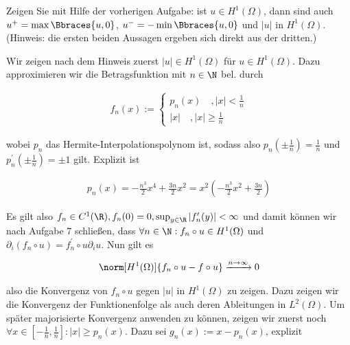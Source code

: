 
\begin{exercise}

Zeigen Sie mit Hilfe der vorherigen Aufgabe:
ist $u \in H^1(\Omega)$, dann sind auch $u^+ = \max \Bbraces{u, 0}$, $u^- = - \min \Bbraces{u, 0}$ und $|u|$ in $H^1(\Omega)$.
(Hinweis: die ersten beiden Aussagen ergeben sich direkt aus der dritten.)

\end{exercise}


\begin{solution}
Wir zeigen nach dem Hinweis zuerst $|u| \in H^1(\Omega)$ für $u \in H^1(\Omega)$. Dazu approximieren wir
die Betragsfunktion mit $n \in \N$ bel. durch

\begin{align*}
  f_n(x)
  :=
  \begin{cases}
    p_n(x) \quad , |x| < \frac{1}{n} \\
    |x|  \quad , |x| \geq \frac{1}{n}
  \end{cases}
\end{align*}

wobei $p_n$ das Hermite-Interpolationspolynom ist, sodass also $p_n(\pm \frac{1}{n}) = \frac{1}{n}$ und
$p_n^\prime(\pm \frac{1}{n}) = \pm 1$ gilt. Explizit ist

\begin{align*}
  p_n(x)
  =
  -\frac{n^3}{2}x^4 + \frac{3n}{2}x^2
  =
  x^2(-\frac{n^3}{2}x^2 + \frac{3n}{2})
\end{align*}

Es gilt also $f_n \in C^1(\R), f_n(0) = 0,\sup_{y \in \R}|f_n^\prime(y)|<\infty$ und damit können wir nach
Aufgabe $7$ schließen, dass $\forall n \in \N: f_n \circ u \in H^1(\Omega)$ und $\partial_i (f_n \circ u) =
f_n^\prime \circ u \partial_i u$. Nun gilt es

\begin{align*}
  \norm[H^1(\Omega)]{f_n \circ u - f \circ u}
  \xrightarrow{n \to \infty}
  0
\end{align*}

also die Konvergenz von $f_n \circ u$ gegen $|u|$ in $H^1(\Omega)$ zu zeigen. Dazu zeigen wir
die Konvergenz der Funktionenfolge als auch deren Ableitungen in $L^2(\Omega)$.
Um später majorisierte Konvergenz anwenden zu können, zeigen wir zuerst noch $\forall x \in [-\frac{1}{n},\frac{1}{n}]: |x| \geq p_n(x)$. Dazu sei $g_n(x):= x - p_n(x)$, explizit


\end{solution}
